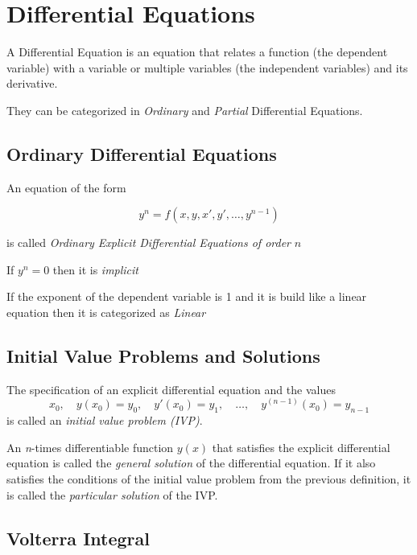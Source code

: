 \newpage
\section{Differential Equations}

A Differential Equation is an equation that relates a function (the dependent variable)
with a variable or multiple variables (the independent variables) and its derivative.
\vspace{\baselineskip}

They can be categorized in \emph{Ordinary} and \emph{Partial} Differential Equations.

\subsection{Ordinary Differential Equations}

An equation of the form 

\[
y^n = f(x, y, x', y', \dots, y^{n -1})
\]

is called \emph{Ordinary Explicit Differential Equations of order} \(n\)
\vspace{\baselineskip}

If \(y^n = 0\) then it is \emph{implicit}
\vspace{\baselineskip}

If the exponent of the dependent variable is 1 and it
is build like a linear equation then it is categorized as \emph{Linear}

\subsection{Initial Value Problems and Solutions}

The specification of an explicit differential equation and the values
\[
x_0,\quad y(x_0) = y_0,\quad y'(x_0) = y_1,\quad \dots,\quad y^{(n-1)}(x_0) = y_{n-1}
\]
is called an \emph{initial value problem (IVP)}.

An \emph{n}-times differentiable function \( y(x) \) that satisfies 
the explicit differential equation is called the \emph{general solution} of the 
differential equation. If it also satisfies the conditions of the initial value problem 
from the previous definition, it is called the \emph{particular solution} of the IVP\@.

\subsection{Volterra Integral}

